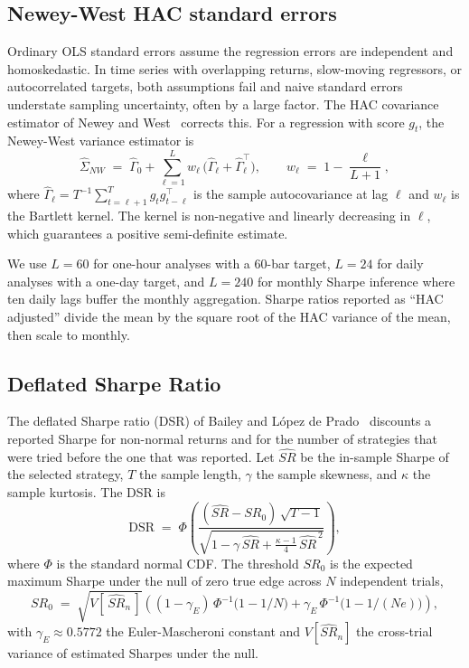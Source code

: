 \documentclass[11pt]{article}
\begin{document}
\subsection{Newey-West HAC standard errors}
\label{app:hac}

Ordinary OLS standard errors assume the regression errors are independent and
homoskedastic. In time series with overlapping returns, slow-moving regressors, or
autocorrelated targets, both assumptions fail and naive standard errors understate sampling
uncertainty, often by a large factor. The HAC covariance estimator of
Newey and West~\cite{newey1987hac} corrects this. For a regression with score $g_t$, the
Newey-West variance estimator is
\[
\hat{\Sigma}_{NW} \;=\; \hat{\Gamma}_0 + \sum_{\ell = 1}^{L} w_\ell \, \big( \hat{\Gamma}_\ell + \hat{\Gamma}_\ell^\top \big),
\qquad
w_\ell \;=\; 1 - \frac{\ell}{L+1},
\]
where $\hat{\Gamma}_\ell = T^{-1} \sum_{t = \ell+1}^{T} g_t g_{t-\ell}^\top$ is the sample
autocovariance at lag $\ell$ and $w_\ell$ is the Bartlett kernel. The kernel is
non-negative and linearly decreasing in $\ell$, which guarantees a positive semi-definite
estimate.

We use $L = 60$ for one-hour analyses with a 60-bar target, $L = 24$ for daily analyses
with a one-day target, and $L = 240$ for monthly Sharpe inference where ten daily lags
buffer the monthly aggregation. Sharpe ratios reported as ``HAC adjusted'' divide the mean
by the square root of the HAC variance of the mean, then scale to monthly.

\subsection{Deflated Sharpe Ratio}
\label{app:dsr}

The deflated Sharpe ratio (DSR) of Bailey and L\'opez de Prado~\cite{bailey2014dsr}
discounts a reported Sharpe for non-normal returns and for the number of strategies that
were tried before the one that was reported. Let $\widehat{SR}$ be the in-sample Sharpe of
the selected strategy, $T$ the sample length, $\gamma$ the sample skewness, and $\kappa$
the sample kurtosis. The DSR is
\[
\mathrm{DSR} \;=\; \Phi\!\left( \frac{ (\widehat{SR} - SR_0) \, \sqrt{T - 1} }
    { \sqrt{1 - \gamma \, \widehat{SR} + \tfrac{\kappa - 1}{4} \, \widehat{SR}^{\,2} } } \right),
\]
where $\Phi$ is the standard normal CDF. The threshold $SR_0$ is the expected maximum
Sharpe under the null of zero true edge across $N$ independent trials,
\[
SR_0 \;=\; \sqrt{V[\,\widehat{SR}_n\,]} \left( (1 - \gamma_E) \, \Phi^{-1}\!\big(1 - 1/N\big)
    + \gamma_E \, \Phi^{-1}\!\big(1 - 1/(N e)\big) \right),
\]
with $\gamma_E \approx 0.5772$ the Euler-Mascheroni constant and $V[\widehat{SR}_n]$ the
cross-trial variance of estimated Sharpes under the null.
\end{document}
